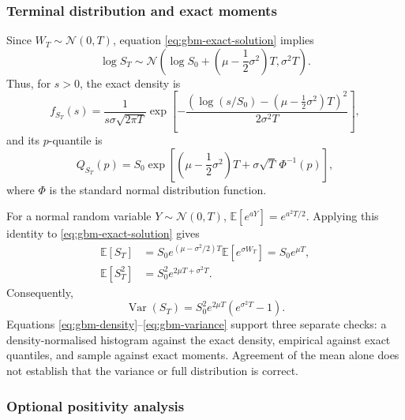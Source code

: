 \subsubsection{Terminal distribution and exact moments}

Since $W_T\sim\mathcal{N}(0,T)$, equation
\eqref{eq:gbm-exact-solution} implies
\begin{equation}
    \log S_T\sim\mathcal{N}\!\left(
       \log S_0+\left(\mu-\frac12\sigma^2\right)T,
       \sigma^2T
    \right).
    \label{eq:gbm-lognormal}
\end{equation}
Thus, for $s>0$, the exact density is
\begin{equation}
    f_{S_T}(s)
      =\frac{1}{s\sigma\sqrt{2\pi T}}
       \exp\!\left[
         -\frac{\left(\log(s/S_0)-
         (\mu-\tfrac12\sigma^2)T\right)^2}{2\sigma^2T}
       \right],
    \label{eq:gbm-density}
\end{equation}
and its $p$-quantile is
\begin{equation}
    Q_{S_T}(p)=S_0\exp\!\left[
       \left(\mu-\frac12\sigma^2\right)T
       +\sigma\sqrt{T}\,\Phi^{-1}(p)
    \right],
    \label{eq:gbm-quantile}
\end{equation}
where $\Phi$ is the standard normal distribution function.

For a normal random variable $Y\sim\mathcal{N}(0,T)$,
$\mathbb{E}[e^{aY}]=e^{a^2T/2}$.  Applying this identity to
\eqref{eq:gbm-exact-solution} gives
\begin{align}
    \mathbb{E}[S_T]
      &=S_0e^{(\mu-\sigma^2/2)T}
        \mathbb{E}[e^{\sigma W_T}]
        =S_0e^{\mu T},
        \label{eq:gbm-mean}\\
    \mathbb{E}[S_T^2]
      &=S_0^2e^{2\mu T+\sigma^2T}.
    \label{eq:gbm-second-moment}
\end{align}
Consequently,
\begin{equation}
    \operatorname{Var}(S_T)
       =S_0^2e^{2\mu T}\left(e^{\sigma^2T}-1\right).
    \label{eq:gbm-variance}
\end{equation}
Equations \eqref{eq:gbm-density}--\eqref{eq:gbm-variance} support three
separate checks: a density-normalised histogram against the exact density,
empirical against exact quantiles, and sample against exact moments.  Agreement
of the mean alone does not establish that the variance or full distribution is
correct.

\subsubsection{Optional positivity analysis}
\label{subsubsec:gbm-positivity}

